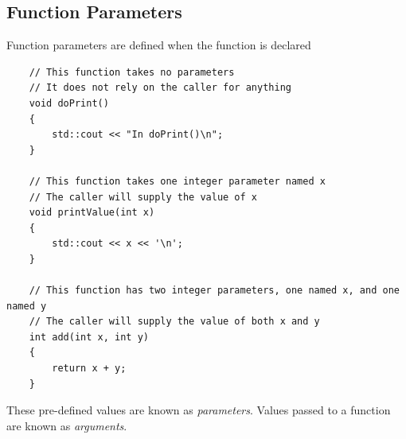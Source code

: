 \documentclass[]{article}
\begin{document}
\subsection{Function Parameters}

Function parameters are defined when the function is declared
\begin{verbatim}
	// This function takes no parameters
	// It does not rely on the caller for anything
	void doPrint()
	{
		std::cout << "In doPrint()\n";
	}
	
	// This function takes one integer parameter named x
	// The caller will supply the value of x
	void printValue(int x)
	{
		std::cout << x << '\n';
	}
	
	// This function has two integer parameters, one named x, and one named y
	// The caller will supply the value of both x and y
	int add(int x, int y)
	{
		return x + y;
	}
\end{verbatim}
These pre-defined values are known as \textit{parameters}.
Values passed to a function are known as \textit{arguments}.
\printindex
\end{document}
